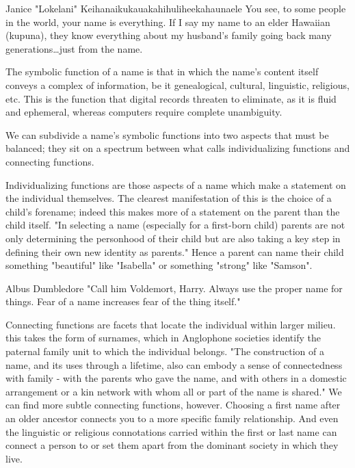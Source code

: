\begin{aquote}{Janice "Lokelani" Keihanaikukauakahihuliheekahaunaele
	\parencite{lee-valley}}
	You see, to some people in the world, your name is everything. If I say my
	name to an elder Hawaiian (kupuna), they know everything about my husband's
	family going back many generations…just from the name.
\end{aquote}

The symbolic function of a name is that in which the name's content itself
conveys a complex of information, be it genealogical, cultural, linguistic,
religious, etc. This is the function that digital records threaten to eliminate,
as it is fluid and ephemeral, whereas computers require complete unambiguity.

We can subdivide a name's symbolic functions into two aspects that must be
balanced; they sit on a spectrum between what \textcite{finch08} calls
individualizing functions and connecting functions.

Individualizing functions are those aspects of a name which make a statement on
the individual themselves. The clearest manifestation of this is the choice of a
child's forename; indeed this makes more of a statement on the parent than the
child itself. "In selecting a name (especially for a first-born child) parents
are not only determining the personhood of their child but are also taking a key
step in defining their own new identity as parents." \parencite[718]{finch08}
Hence a parent can name their child something "beautiful" like "Isabella" or
something "strong" like "Samson".

\begin{aquote}{Albus Dumbledore}
"Call him Voldemort, Harry. Always use the proper name for things. Fear of a
name increases fear of the thing itself." \parencite{rowling97}
\end{aquote}

Connecting functions are facets that locate the individual within larger milieu.
this takes the form of surnames, which in Anglophone societies identify the
paternal family unit to which the individual belongs. "The construction of a
name, and its uses through a lifetime, also can embody a sense of connectedness
with family - with the parents who gave the name, and with others in a domestic
arrangement or a kin network with whom all or part of the name is shared."
\parencite[711]{finch08} We can find more subtle connecting functions, however.
Choosing a first name after an older ancestor connects you to a more specific
family relationship. And even the linguistic or religious connotations carried
within the first or last name can connect a person to or set them apart from the
dominant society in which they live.
